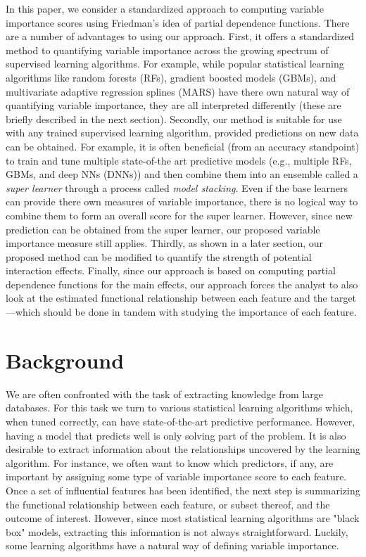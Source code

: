 \documentclass[12pt]{article}
\begin{document}
In this paper, we consider a standardized approach to computing variable importance scores using Friedman's idea of partial dependence functions. There are a number of advantages to using our approach. First, it offers a standardized method to quantifying variable importance across the growing spectrum of supervised learning algorithms. For example, while popular statistical learning algorithms like random forests (RFs), gradient boosted models (GBMs), and multivariate adaptive regression splines (MARS) have there own natural way of quantifying variable importance, they are all interpreted differently (these are briefly described in the next section). Secondly, our method is suitable for use with any trained supervised learning algorithm, provided predictions on new data can be obtained. For example, it is often beneficial (from an accuracy standpoint) to train and tune multiple state-of-the art predictive models (e.g., multiple RFs, GBMs, and deep NNs (DNNs)) and then combine them into an ensemble called a \textit{super learner} through a process called \textit{model stacking}. Even if the base learners can provide there own measures of variable importance, there is no logical way to combine them to form an overall score for the super learner. However, since new prediction can be obtained from the super learner, our proposed variable importance measure still applies. Thirdly, as shown in a later section, our proposed method can be modified to quantify the strength of potential interaction effects. Finally, since our approach is based on computing partial dependence functions for the main effects, our approach forces the analyst to also look at the estimated functional relationship between each feature and the target---which should be done in tandem with studying the importance of each feature.


\section{Background}
\label{sec:background}

We are often confronted with the task of extracting knowledge from large databases. For this task we turn to various statistical learning algorithms which, when tuned correctly, can have state-of-the-art predictive performance. However, having a model that predicts well is only solving part of the problem. It is also desirable to extract information about the relationships uncovered by the learning algorithm. For instance, we often want to know which predictors, if any, are important by assigning some type of variable importance score to each feature. Once a set of influential features has been identified, the next step is summarizing the functional relationship between each feature, or subset thereof, and the outcome of interest. However, since most statistical learning algorithms are "black box" models, extracting this information is not always straightforward. Luckily, some learning algorithms have a natural way of defining variable importance.
\end{document}
